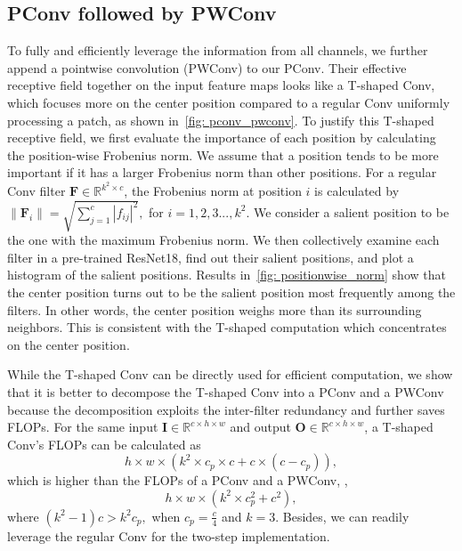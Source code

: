 \subsection{PConv followed by PWConv }
To fully and efficiently leverage the information from all channels, we further append a pointwise convolution (PWConv) to our PConv. Their effective receptive field together on the input feature maps looks like a 
T-shaped
Conv, which focuses more on the center position compared to a regular Conv uniformly processing a patch, as shown in~\cref{fig: pconv_pwconv}.
To justify this T-shaped
receptive field, we first evaluate the importance of each position by calculating the position-wise Frobenius norm. We assume that a position tends to be more important if it has a larger Frobenius norm than other positions. 
For a regular Conv filter
$\mathbf{F} \in \mathbb{R}^{  k^2 \times  c}$, 
the Frobenius norm at position 
$i$
is calculated by
$\left\|\mathbf{F}_{i}\right\| \!=\! \sqrt{
  \sum_{j=1}^c |f_{ij}|^2
  },
$
for $i = 1, 2, 3 ..., k^2$.
We consider a salient position to be the one with the maximum Frobenius norm.
We then collectively examine each filter in a pre-trained ResNet18, find out their salient positions, and plot a histogram of the salient positions. 
Results in~\cref{fig: positionwise_norm} show that the center position turns out to be the salient position most frequently among the filters. 
In other words, the center position weighs more than its surrounding neighbors. This is consistent with the T-shaped computation which concentrates on the center position.
 
While the
 T-shaped Conv can be directly used for efficient computation, we show that it is better to decompose the T-shaped Conv into a PConv and a PWConv because the decomposition exploits the inter-filter redundancy and  further saves FLOPs. For the same input 
 $\mathbf{I} \in \mathbb{R}^{ c \times h \times w}$ 
 and output 
 $\mathbf{O} \in \mathbb{R}^{ c \times h \times w}$,
 a T-shaped Conv's FLOPs can be calculated as 
 \begin{equation}
h \times w \times \left(k^2 \times c_p \times c + c \times \left(c - c_p\right) \right),
  \label{eq:FLOPs_tuConv}
\end{equation}
which is higher than the FLOPs of a PConv and a PWConv, \ie,
\begin{equation}
   h \times w \times ( k^2 \times c_p^2 + c^2),
  \label{eq:FLOPs_PConv_PWConv}
\end{equation}
where
$
(k^{2} - 1)c > k^{2} c_p,
$
\eg when 
$
c_p = \frac{c}{4}
$
and 
$
k = 3.
$
Besides, we can readily leverage the regular Conv for the two-step implementation.

